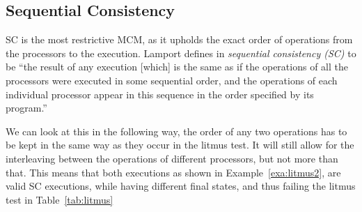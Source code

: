 \documentclass[runningheads]{llncs}
\begin{document}
\subsection{Sequential Consistency}
\label{sec:sc}
SC is the most restrictive MCM, as it upholds the exact order of operations from the processors to the execution.
Lamport defines in \cite{lamport1979make} \emph{sequential consistency (SC)} to be
``the result of any execution [which] is the same as if the operations of all
the processors were executed in some sequential order, and the
operations of each individual processor appear in this sequence in
the order specified by its program.''

We can look at this in the following way, the order of any two operations has to be kept in the same way as they occur in the litmus test.
It will still allow for the interleaving between the operations of different processors, but not more than that.
This means that both executions as shown in Example~\ref{exa:litmus2}, are valid SC executions, while having different final states, and thus failing the litmus test in Table~\ref{tab:litmus}
\end{document}
